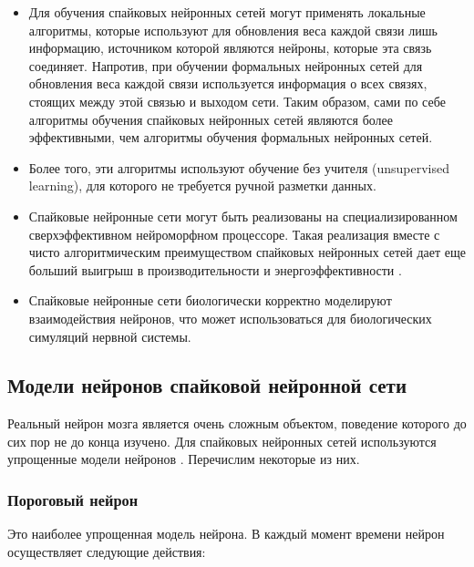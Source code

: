 \documentclass[a4paper]{article}
\begin{document}
\begin{itemize}
\item Для обучения спайковых нейронных сетей могут применять локальные алгоритмы, которые используют для обновления веса каждой связи лишь информацию, источником которой являются нейроны, которые эта связь соединяет. Напротив, при обучении формальных нейронных сетей для обновления веса каждой связи используется информация о всех связях, стоящих между этой связью и выходом сети. Таким образом, сами по себе алгоритмы обучения спайковых нейронных сетей являются более эффективными, чем алгоритмы обучения формальных нейронных сетей.
\item Более того, эти алгоритмы используют обучение без учителя (unsupervised learning), для которого не требуется ручной разметки данных.
\item Спайковые нейронные сети могут быть реализованы на специализированном сверхэффективном нейроморфном процессоре. Такая реализация вместе с чисто алгоритмическим преимуществом спайковых нейронных сетей дает еще больший выигрыш в производительности и энергоэффективности \cite{hardware1, hardware2}. 
\item Спайковые нейронные сети биологически корректно моделируют взаимодействия нейронов, что может использоваться для биологических симуляций нервной системы.
\end{itemize}

\subsection{Модели нейронов спайковой нейронной сети}
Реальный нейрон мозга является очень сложным объектом, поведение которого до сих пор не до конца изучено. Для спайковых нейронных сетей используются упрощенные модели нейронов \cite{neuronmodels}. Перечислим некоторые из них.

\subsubsection{Пороговый нейрон}
Это наиболее упрощенная модель нейрона. В каждый момент времени нейрон осуществляет следующие действия:
\end{document}
